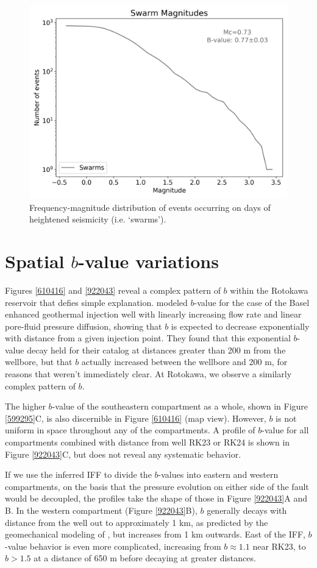 \begin{figure}[h!]
\begin{center}
\includegraphics[width=0.70\columnwidth]{Chapter_4_Rot/figures/Rot_swarms_thresh_30/Rot_swarms_thresh_30_original}
\caption{{Frequency-magnitude distribution of events occurring on days of
heightened seismicity (i.e. `swarms').
{\label{322180}}%
}}
\end{center}
\end{figure}

\section{Spatial $b$-value variations}\label{bvals}
Figures \ref{610416} and \ref{922043} reveal a complex pattern of $b$ within the Rotokawa reservoir that defies simple explanation. \citet{Bachmann_2012} modeled $b$-value for the case of the Basel enhanced geothermal injection well with linearly increasing flow rate and linear pore-fluid pressure diffusion, showing that $b$ is expected to decrease exponentially with distance from a given injection point. They found that this exponential $b$-value decay held for their catalog at distances greater than 200 m from the wellbore, but that $b$ actually increased between the wellbore and 200 m, for reasons that weren't immediately clear. At Rotokawa, we observe a similarly complex pattern of $b$.

The higher $b$-value of the southeastern compartment as a whole, shown in Figure \ref{599295}C, is also discernible in Figure \ref{610416} (map view). However, $b$ is not uniform in space throughout any of the compartments. A profile of $b$-value for all compartments combined with distance from well RK23 or RK24 is shown in Figure \ref{922043}C, but does not reveal any systematic behavior.

If we use the inferred IFF to divide the $b$-values into eastern and western compartments, on the basis that the pressure evolution on either side of the fault would be decoupled, the profiles take the shape of those in Figure \ref{922043}A and B. In the western compartment (Figure \ref{922043}B), $b$ generally decays with distance from the well out to approximately 1 km, as predicted by the geomechanical modeling of \citep{Bachmann_2012}, but increases from 1 km outwards. East of the IFF, $b$-value behavior is even more complicated, increasing from $b\approx1.1$ near RK23, to $b>1.5$ at a distance of 650 m before decaying at greater distances.

